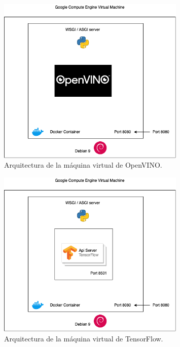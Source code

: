 \begin{figure}[H]
    \centering
    \includegraphics[width=0.8\textwidth]{images/chapter4/openvino_ce.png}
    \caption{Arquitectura de la máquina virtual de OpenVINO.}
    \label{fig:Arquitectura de la máquina virtual de OpenVINO}
\end{figure}

\begin{figure}[H]
    \centering
    \includegraphics[width=0.8\textwidth]{images/chapter4/tensorflow_ce.png}
    \caption{Arquitectura de la máquina virtual de TensorFlow.}
    \label{fig:Arquitectura de la máquina virtual de TensorFlow}
\end{figure}

